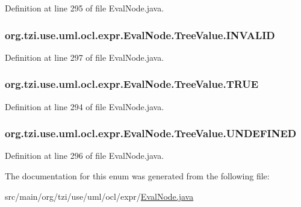 Definition at line 295 of file Eval\-Node.\-java.

\hypertarget{enumorg_1_1tzi_1_1use_1_1uml_1_1ocl_1_1expr_1_1_eval_node_1_1_tree_value_aff902f08a7612c2960a895d0a7551178}{
\subsubsection[{I\-N\-V\-A\-L\-I\-D}]{\setlength{\rightskip}{0pt plus 5cm}org.\-tzi.\-use.\-uml.\-ocl.\-expr.\-Eval\-Node.\-Tree\-Value.\-I\-N\-V\-A\-L\-I\-D}}\label{enumorg_1_1tzi_1_1use_1_1uml_1_1ocl_1_1expr_1_1_eval_node_1_1_tree_value_aff902f08a7612c2960a895d0a7551178}


Definition at line 297 of file Eval\-Node.\-java.

\hypertarget{enumorg_1_1tzi_1_1use_1_1uml_1_1ocl_1_1expr_1_1_eval_node_1_1_tree_value_a8b45f4b8903b91d12b65bb850c33dbc2}{
\subsubsection[{T\-R\-U\-E}]{\setlength{\rightskip}{0pt plus 5cm}org.\-tzi.\-use.\-uml.\-ocl.\-expr.\-Eval\-Node.\-Tree\-Value.\-T\-R\-U\-E}}\label{enumorg_1_1tzi_1_1use_1_1uml_1_1ocl_1_1expr_1_1_eval_node_1_1_tree_value_a8b45f4b8903b91d12b65bb850c33dbc2}


Definition at line 294 of file Eval\-Node.\-java.

\hypertarget{enumorg_1_1tzi_1_1use_1_1uml_1_1ocl_1_1expr_1_1_eval_node_1_1_tree_value_a523dd8a6eaaad40da942f6deb29ec4e7}{
\subsubsection[{U\-N\-D\-E\-F\-I\-N\-E\-D}]{\setlength{\rightskip}{0pt plus 5cm}org.\-tzi.\-use.\-uml.\-ocl.\-expr.\-Eval\-Node.\-Tree\-Value.\-U\-N\-D\-E\-F\-I\-N\-E\-D}}\label{enumorg_1_1tzi_1_1use_1_1uml_1_1ocl_1_1expr_1_1_eval_node_1_1_tree_value_a523dd8a6eaaad40da942f6deb29ec4e7}


Definition at line 296 of file Eval\-Node.\-java.



The documentation for this enum was generated from the following file\-:\begin{DoxyCompactItemize}
\item 
src/main/org/tzi/use/uml/ocl/expr/\hyperlink{_eval_node_8java}{Eval\-Node.\-java}\end{DoxyCompactItemize}
